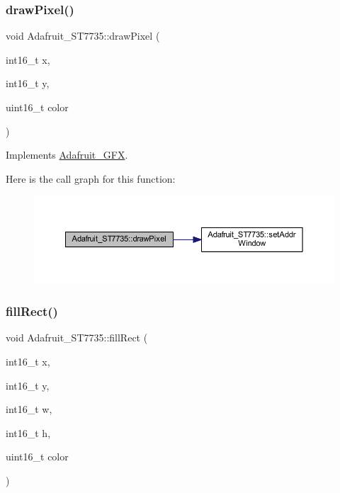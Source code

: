 \subsubsection{\texorpdfstring{draw\+Pixel()}{drawPixel()}}
{\footnotesize\ttfamily void Adafruit\+\_\+\+S\+T7735\+::draw\+Pixel (\begin{DoxyParamCaption}\item[{int16\+\_\+t}]{x,  }\item[{int16\+\_\+t}]{y,  }\item[{uint16\+\_\+t}]{color }\end{DoxyParamCaption})\hspace{0.3cm}{\ttfamily [virtual]}}



Implements \hyperlink{class_adafruit___g_f_x_ab7fbf72885c873266f9c7eb53b5c8896}{Adafruit\+\_\+\+G\+FX}.

Here is the call graph for this function\+:
\nopagebreak
\begin{figure}[H]
\begin{center}
\leavevmode
\includegraphics[width=350pt]{dd/dee/class_adafruit___s_t7735_af22a5ba7282850793f4943ba2d682af0_cgraph}
\end{center}
\end{figure}
\mbox{\label{class_adafruit___s_t7735_a3556265c5b017cd2cdceb1f34e9bc421}} 
\subsubsection{\texorpdfstring{fill\+Rect()}{fillRect()}}
{\footnotesize\ttfamily void Adafruit\+\_\+\+S\+T7735\+::fill\+Rect (\begin{DoxyParamCaption}\item[{int16\+\_\+t}]{x,  }\item[{int16\+\_\+t}]{y,  }\item[{int16\+\_\+t}]{w,  }\item[{int16\+\_\+t}]{h,  }\item[{uint16\+\_\+t}]{color }\end{DoxyParamCaption})}

